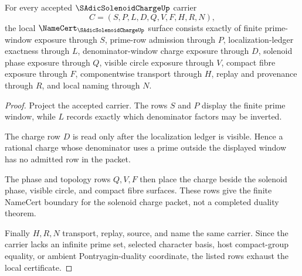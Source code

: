 \begin{theorem}
\label{thm:s-adic-solenoid-charge-namecert-obligations}
For every accepted $\SAdicSolenoidChargeUp$ carrier
$$
C=(S,P,L,D,Q,V,F,H,R,N),
$$
the local $\NameCert_{\SAdicSolenoidChargeUp}$ surface consists exactly of finite prime-window exposure through $S$, prime-row admission through $P$, localization-ledger exactness through $L$, denominator-window charge exposure through $D$, solenoid phase exposure through $Q$, visible circle exposure through $V$, compact fibre exposure through $F$, componentwise transport through $H$, replay and provenance through $R$, and local naming through $N$.
\end{theorem}
\begin{proof}
Project the accepted carrier. The rows $S$ and $P$ display the finite prime window, while $L$ records exactly which denominator factors may be inverted.

The charge row $D$ is read only after the localization ledger is visible. Hence a rational charge whose denominator uses a prime outside the displayed window has no admitted row in the packet.

The phase and topology rows $Q,V,F$ then place the charge beside the solenoid phase, visible circle, and compact fibre surfaces. These rows give the finite NameCert boundary for the solenoid charge packet, not a completed duality theorem.

Finally $H,R,N$ transport, replay, source, and name the same carrier. Since the carrier lacks an infinite prime set, selected character basis, host compact-group equality, or ambient Pontryagin-duality coordinate, the listed rows exhaust the local certificate.
\end{proof}

